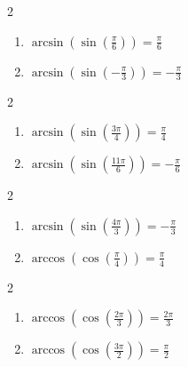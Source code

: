\documentclass{ximera}
\begin{document}
\begin{multicols}{2}

\begin{enumerate}

\setcounter{enumi}{\value{HW}}

\item  $\arcsin\left(\sin\left(\frac{\pi}{6}\right) \right) = \frac{\pi}{6}$
\item  $\arcsin\left(\sin\left(-\frac{\pi}{3}\right) \right) = -\frac{\pi}{3}$

\setcounter{HW}{\value{enumi}}

\end{enumerate}

\end{multicols}

\begin{multicols}{2}

\begin{enumerate}

\setcounter{enumi}{\value{HW}}

\item  $\arcsin\left(\sin\left(\frac{3\pi}{4}\right) \right) = \frac{\pi}{4}$
\item  $\arcsin\left(\sin\left(\frac{11\pi}{6}\right) \right) = -\frac{\pi}{6}$

\setcounter{HW}{\value{enumi}}

\end{enumerate}

\end{multicols}

\begin{multicols}{2}

\begin{enumerate}

\setcounter{enumi}{\value{HW}}

\item  $\arcsin\left(\sin\left(\frac{4\pi}{3}\right) \right) = -\frac{\pi}{3}$
\item  $\arccos\left(\cos\left(\frac{\pi}{4}\right) \right) = \frac{\pi}{4}$ 

\setcounter{HW}{\value{enumi}}

\end{enumerate}

\end{multicols}

\begin{multicols}{2}

\begin{enumerate}

\setcounter{enumi}{\value{HW}}

\item  $\arccos\left(\cos\left(\frac{2\pi}{3}\right) \right) = \frac{2\pi}{3}$
\item  $\arccos\left(\cos\left(\frac{3\pi}{2}\right) \right) = \frac{\pi}{2}$

\setcounter{HW}{\value{enumi}}

\end{enumerate}

\end{multicols}
\end{document}
